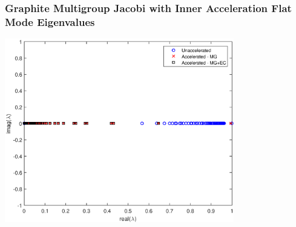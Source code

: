 \documentclass[compress,10pt]{beamer}
\begin{document}
\begin{frame}[t]
{}
{
\frametitle{\small Graphite Multigroup Jacobi with Inner Acceleration Flat Mode Eigenvalues}
\hspace*{1.1cm}
\includegraphics[width=0.75\textwidth]{images/IM1_Graph_FA_MJIA.eps}
}
\end{frame}
\end{document}
